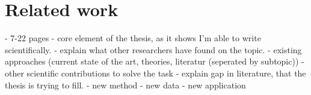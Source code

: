 \chapter{Related work}

- 7-22 pages
- core element of the thesis, as it shows I'm able to write scientifically.
- explain what other researchers have found on the topic.
  - existing approaches (current state of the art, theories, literatur (seperated by subtopic))
  - other scientific contributions to solve the task
- explain gap in literature, that the thesis is trying to fill.
  - new method
  - new data
  - new application
